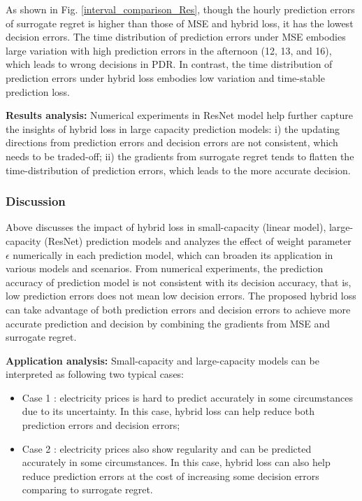 \documentclass[journal]{IEEEtran}
\begin{document}
As shown in Fig. \ref{interval_comparison_Res}, though the hourly prediction errors of surrogate regret is higher than those of MSE and hybrid loss, it has the lowest decision errors. The time distribution of prediction errors under MSE embodies large variation with high prediction errors in the afternoon (12, 13, and 16), which leads to wrong decisions in PDR. In contrast, the time distribution of prediction errors under hybrid loss embodies low variation and time-stable prediction loss.

\textbf{Results analysis:}
Numerical experiments in ResNet model help further capture the insights of hybrid loss in large capacity prediction models: i) the updating directions from prediction errors and decision errors are not consistent, which needs to be traded-off; ii) the gradients from surrogate regret tends to flatten the time-distribution of prediction errors, which leads to the more accurate decision.

\subsubsection{Discussion}

Above discusses the impact of hybrid loss in small-capacity (linear model), large-capacity (ResNet) prediction models and analyzes the effect of weight parameter $\epsilon$ numerically in each prediction model, which can broaden its application in various models and scenarios. From numerical experiments, the prediction accuracy of prediction model is not consistent with its decision accuracy, that is, low prediction errors does not mean low decision errors. The proposed hybrid loss can take advantage of both prediction errors and decision errors to achieve more accurate prediction and decision by combining the gradients from MSE and surrogate regret.

\textbf{Application analysis:}
Small-capacity and large-capacity models can be interpreted as following two typical cases:
\begin{itemize}
  \item Case 1 : electricity prices is hard to predict accurately in some circumstances due to its uncertainty. In this case, hybrid loss can help reduce both prediction errors and decision errors;
  \item Case 2 : electricity prices also show regularity and can be predicted accurately in some circumstances. In this case, hybrid loss can also help reduce prediction errors at the cost of increasing some decision errors comparing to surrogate regret.
\end{itemize}
\end{document}

